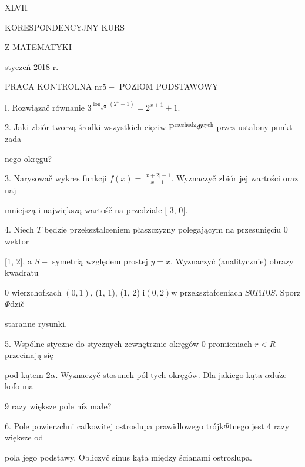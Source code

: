 \documentclass[a4paper,12pt]{article}
\begin{document}
XLVII

KORESPONDENCYJNY KURS

Z MATEMATYKI

styczeń 2018 r.

PRACA KONTROLNA $\mathrm{n}\mathrm{r} 5-$ POZIOM PODSTAWOWY

l. Rozwiązač równanie $3^{\log_{\sqrt{3}}(2^{x}-1)}=2^{x+1}+1.$

2. Jaki zbiór tworzą środki wszystkich cięciw $\mathrm{P}^{\mathrm{r}\mathrm{z}\mathrm{e}\mathrm{c}\mathrm{h}\mathrm{o}\mathrm{d}\mathrm{z}}\Phi^{\mathrm{c}\mathrm{y}\mathrm{c}\mathrm{h}}$ przez ustalony punkt zada-

nego okręgu?

3. Narysowač wykres funkcji $f(x) = \displaystyle \frac{|x+2|-1}{x-1}$. Wyznaczyč zbiór jej wartości oraz naj-

mniejszą $\mathrm{i}$ największą wartośč na przedziale $[$-3, $0].$

4. Niech $T$ będzie przeksztalceniem płaszczyzny polegającym na przesunięciu $0$ wektor

[1, 2], a $S-$ symetrią względem prostej $y=x$. Wyznaczyč (analitycznie) obrazy kwadratu

$0$ wierzchofkach $(0,1)$, (1, 1), (1, 2) $\mathrm{i}(0,2)\mathrm{w}$ przeksztafceniach $S0T\mathrm{i}T0S$. Sporz$\Phi$dzič

staranne rysunki.

5. Wspólne styczne do stycznych zewnętrznie okręgów $0$ promieniach $r<R$ przecinają się

pod kątem $ 2\alpha$. Wyznaczyč stosunek pól tych okręgów. Dla jakiego kąta $\alpha \mathrm{d}\mathrm{u}\dot{\mathrm{z}}\mathrm{e}$ kofo ma

9 razy większe pole $\mathrm{n}\mathrm{i}\dot{\mathrm{z}}$ małe?

6. Pole powierzchni cafkowitej ostroslupa prawidlowego trójk$\Phi$tnego jest 4 razy większe od

pola jego podstawy. Obliczyč sinus kąta między ścianami ostroslupa.
\end{document}
